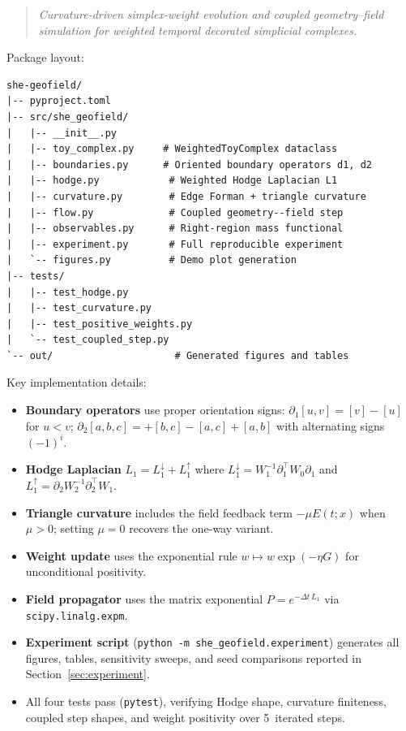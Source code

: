 \documentclass[11pt]{article}
\begin{document}
\begin{quote}
\emph{Curvature-driven simplex-weight evolution and coupled geometry--field simulation for weighted temporal decorated simplicial complexes.}
\end{quote}

Package layout:
\begin{verbatim}
she-geofield/
|-- pyproject.toml
|-- src/she_geofield/
|   |-- __init__.py
|   |-- toy_complex.py     # WeightedToyComplex dataclass
|   |-- boundaries.py      # Oriented boundary operators d1, d2
|   |-- hodge.py            # Weighted Hodge Laplacian L1
|   |-- curvature.py        # Edge Forman + triangle curvature
|   |-- flow.py             # Coupled geometry--field step
|   |-- observables.py      # Right-region mass functional
|   |-- experiment.py       # Full reproducible experiment
|   `-- figures.py          # Demo plot generation
|-- tests/
|   |-- test_hodge.py
|   |-- test_curvature.py
|   |-- test_positive_weights.py
|   `-- test_coupled_step.py
`-- out/                     # Generated figures and tables
\end{verbatim}

Key implementation details:
\begin{itemize}
  \item \textbf{Boundary operators} use proper orientation signs: $\partial_1[u,v]=[v]-[u]$ for $u<v$; $\partial_2[a,b,c]=+[b,c]-[a,c]+[a,b]$ with alternating signs $(-1)^i$.
  \item \textbf{Hodge Laplacian} $L_1=L_1^{\downarrow}+L_1^{\uparrow}$ where $L_1^{\downarrow}=W_1^{-1}\partial_1^\top W_0\partial_1$ and $L_1^{\uparrow}=\partial_2 W_2^{-1}\partial_2^\top W_1$.
  \item \textbf{Triangle curvature} includes the field feedback term $-\mu E(t;x)$ when $\mu>0$; setting $\mu=0$ recovers the one-way variant.
  \item \textbf{Weight update} uses the exponential rule $w\mapsto w\exp(-\eta G)$ for unconditional positivity.
  \item \textbf{Field propagator} uses the matrix exponential $P=e^{-\Delta t\,L_1}$ via \texttt{scipy.linalg.expm}.
  \item \textbf{Experiment script} (\texttt{python -m she\_geofield.experiment}) generates all figures, tables, sensitivity sweeps, and seed comparisons reported in Section~\ref{sec:experiment}.
  \item All four tests pass (\texttt{pytest}), verifying Hodge shape, curvature finiteness, coupled step shapes, and weight positivity over 5~iterated steps.
\end{itemize}
\end{document}
